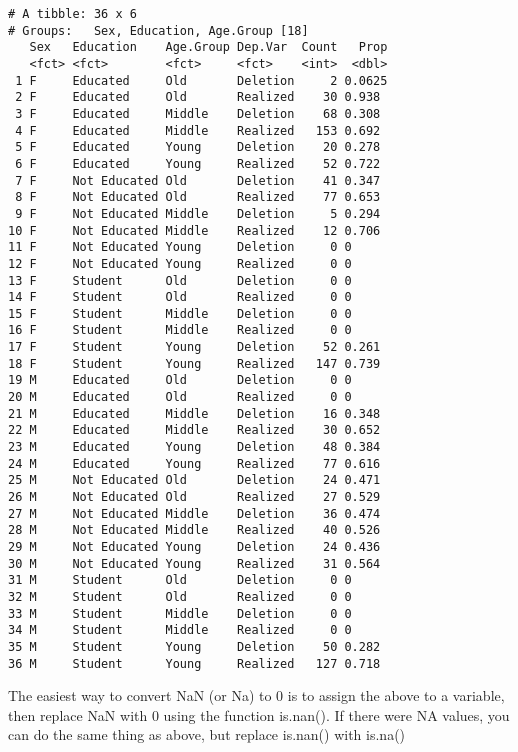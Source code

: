 \documentclass[
  12pt,
  letterpaper]{article}
\renewcommand\texttt[1]{{\ttfamily\color{BrickRed}#1}}
\begin{document}
\begin{verbatim}
# A tibble: 36 x 6
# Groups:   Sex, Education, Age.Group [18]
   Sex   Education    Age.Group Dep.Var  Count   Prop
   <fct> <fct>        <fct>     <fct>    <int>  <dbl>
 1 F     Educated     Old       Deletion     2 0.0625
 2 F     Educated     Old       Realized    30 0.938 
 3 F     Educated     Middle    Deletion    68 0.308 
 4 F     Educated     Middle    Realized   153 0.692 
 5 F     Educated     Young     Deletion    20 0.278 
 6 F     Educated     Young     Realized    52 0.722 
 7 F     Not Educated Old       Deletion    41 0.347 
 8 F     Not Educated Old       Realized    77 0.653 
 9 F     Not Educated Middle    Deletion     5 0.294 
10 F     Not Educated Middle    Realized    12 0.706 
11 F     Not Educated Young     Deletion     0 0     
12 F     Not Educated Young     Realized     0 0     
13 F     Student      Old       Deletion     0 0     
14 F     Student      Old       Realized     0 0     
15 F     Student      Middle    Deletion     0 0     
16 F     Student      Middle    Realized     0 0     
17 F     Student      Young     Deletion    52 0.261 
18 F     Student      Young     Realized   147 0.739 
19 M     Educated     Old       Deletion     0 0     
20 M     Educated     Old       Realized     0 0     
21 M     Educated     Middle    Deletion    16 0.348 
22 M     Educated     Middle    Realized    30 0.652 
23 M     Educated     Young     Deletion    48 0.384 
24 M     Educated     Young     Realized    77 0.616 
25 M     Not Educated Old       Deletion    24 0.471 
26 M     Not Educated Old       Realized    27 0.529 
27 M     Not Educated Middle    Deletion    36 0.474 
28 M     Not Educated Middle    Realized    40 0.526 
29 M     Not Educated Young     Deletion    24 0.436 
30 M     Not Educated Young     Realized    31 0.564 
31 M     Student      Old       Deletion     0 0     
32 M     Student      Old       Realized     0 0     
33 M     Student      Middle    Deletion     0 0     
34 M     Student      Middle    Realized     0 0     
35 M     Student      Young     Deletion    50 0.282 
36 M     Student      Young     Realized   127 0.718 
\end{verbatim}

The easiest way to convert \texttt{NaN} (or \texttt{Na}) to 0 is to
assign the above to a variable, then replace \texttt{NaN} with 0 using
the function \texttt{is.nan()}. If there were \texttt{NA} values, you
can do the same thing as above, but replace \texttt{is.nan()} with
\texttt{is.na()}
\end{document}
